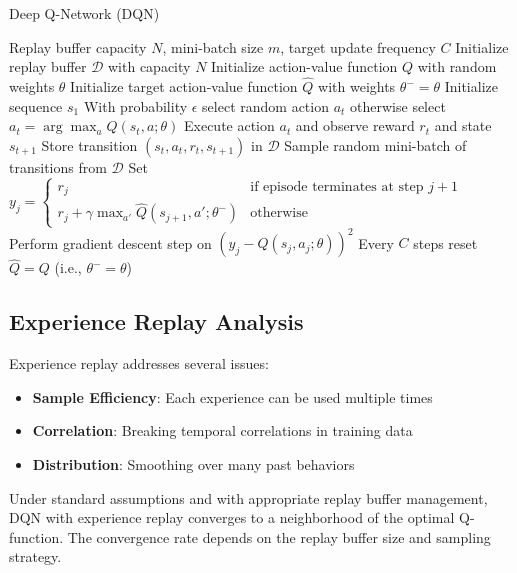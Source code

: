\begin{algorithm}
\caption{Deep Q-Network (DQN)}
\begin{algorithmic}
\REQUIRE Replay buffer capacity $N$, mini-batch size $m$, target update frequency $C$
\STATE Initialize replay buffer $\mathcal{D}$ with capacity $N$
\STATE Initialize action-value function $Q$ with random weights $\theta$
\STATE Initialize target action-value function $\hat{Q}$ with weights $\theta^- = \theta$
    \STATE Initialize sequence $s_1$
        \STATE With probability $\epsilon$ select random action $a_t$
        \STATE otherwise select $a_t = \arg\max_a Q(s_t, a; \theta)$
        \STATE Execute action $a_t$ and observe reward $r_t$ and state $s_{t+1}$
        \STATE Store transition $(s_t, a_t, r_t, s_{t+1})$ in $\mathcal{D}$
        \STATE Sample random mini-batch of transitions from $\mathcal{D}$
        \STATE Set $y_j = \begin{cases}
        r_j & \text{if episode terminates at step } j+1 \\
        r_j + \gamma \max_{a'} \hat{Q}(s_{j+1}, a'; \theta^-) & \text{otherwise}
        \end{cases}$
        \STATE Perform gradient descent step on $(y_j - Q(s_j, a_j; \theta))^2$
        \STATE Every $C$ steps reset $\hat{Q} = Q$ (i.e., $\theta^- = \theta$)
    \ENDFOR
\ENDFOR
\end{algorithmic}
\end{algorithm}

\subsection{Experience Replay Analysis}

Experience replay addresses several issues:

\begin{itemize}
\item \textbf{Sample Efficiency}: Each experience can be used multiple times
\item \textbf{Correlation}: Breaking temporal correlations in training data
\item \textbf{Distribution}: Smoothing over many past behaviors
\end{itemize}

\begin{theorem}
Under standard assumptions and with appropriate replay buffer management, DQN with experience replay converges to a neighborhood of the optimal Q-function. The convergence rate depends on the replay buffer size and sampling strategy.
\end{theorem}

